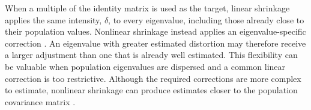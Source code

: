 When a multiple of the identity matrix is used as the target, linear shrinkage applies the same intensity, \(\delta\), to every eigenvalue, including those already close to their population values. Nonlinear shrinkage instead applies an eigenvalue-specific correction \parencites[1025]{ledoit2012nonlinear}[199, 205]{ledoitwolf2022power}. An eigenvalue with greater estimated distortion may therefore receive a larger adjustment than one that is already well estimated. This flexibility can be valuable when population eigenvalues are dispersed and a common linear correction is too restrictive. Although the required corrections are more complex to estimate, nonlinear shrinkage can produce estimates closer to the population covariance matrix \parencite[1025--1026]{ledoit2012nonlinear}.
